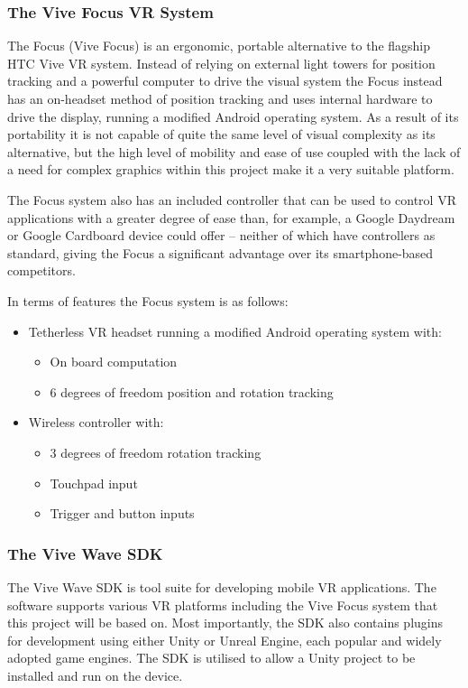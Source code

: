 \documentclass[10pt,letterpaper]{article}
\begin{document}
\subsubsection * {The Vive Focus VR System}
The Focus (Vive Focus) is an ergonomic, portable alternative to the flagship HTC Vive VR system. Instead of relying on external light towers for position tracking and a powerful computer to drive the visual system the Focus instead has an on-headset method of position tracking and uses internal hardware to drive the display, running a modified Android operating system. As a result of its portability it is not capable of quite the same level of visual complexity as its alternative, but the high level of mobility and ease of use coupled with the lack of a need for complex graphics within this project make it a very suitable platform. 

The Focus system also has an included controller that can be used to control VR applications with a greater degree of ease than, for example, a Google Daydream or Google Cardboard device could offer – neither of which have controllers as standard, giving the Focus a significant advantage over its smartphone-based competitors. 

In terms of features the Focus system is as follows:
\begin{itemize}
	\item Tetherless VR headset running a modified Android operating system with:
	\begin{itemize}
		\item On board computation
		\item 6 degrees of freedom position and rotation tracking 
	\end{itemize}
	\item Wireless controller with: 
	\begin{itemize}
		\item 3 degrees of freedom rotation tracking 
		\item Touchpad input
		\item Trigger and button inputs
	\end{itemize}
\end{itemize}
\subsubsection * {The Vive Wave SDK}
The Vive Wave SDK is tool suite for developing mobile VR applications. The software supports various VR platforms including the Vive Focus system that this project will be based on. Most importantly, the SDK also contains plugins for development using either Unity or Unreal Engine, each popular and widely adopted game engines. The SDK is utilised to allow a Unity project to be installed and run on the device.
\end{document}

